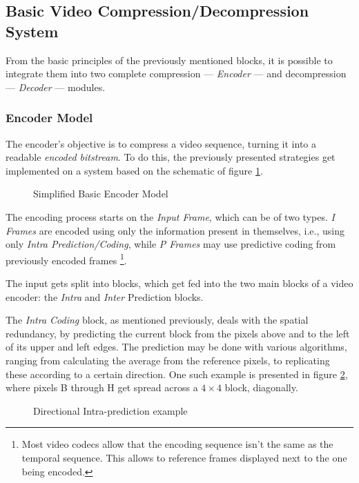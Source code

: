 \subsection{Basic Video Compression/Decompression System}

From the basic principles of the previously mentioned blocks, it is possible to integrate them into two complete compression --- \emph{Encoder} --- and decompression --- \emph{Decoder} --- modules.

\subsubsection{Encoder Model}

The encoder's objective is to compress a video sequence, turning it into a readable \emph{encoded bitstream}. To do this, the previously presented strategies get implemented on a system based on the schematic of figure \ref{fig:basicenc}.

\begin{figure}[!htbp]
    \centering
    
    \caption{Simplified Basic Encoder Model}
    \label{fig:basicenc}
\end{figure}

The encoding process starts on the \emph{Input Frame}, which can be of two types. \emph{I Frames} are encoded using only the information present in themselves, i.e., using only \emph{Intra Prediction/Coding}, while \emph{P Frames} may use predictive coding from previously encoded frames \footnote{Most video codecs allow that the encoding sequence isn't the same as the temporal sequence. This allows to reference frames displayed next to the one being encoded.}.

The input gets split into blocks, which get fed into the two main blocks of a video encoder: the \emph{Intra} and \emph{Inter} Prediction blocks.

The \emph{Intra Coding} block, as mentioned previously, deals with the spatial redundancy, by predicting the current block from the pixels above and to the left of its upper and left edges. The prediction may be done with various algorithms, ranging from calculating the average from the reference pixels, to replicating these according to a certain direction. One such example is presented in figure \ref{fig:intraex}, where pixels B through H get spread across a $4\times 4$ block, diagonally.

\begin{figure}[!htbp]
    \centering
    
    \caption{Directional Intra-prediction example}
    \label{fig:intraex}
\end{figure}

